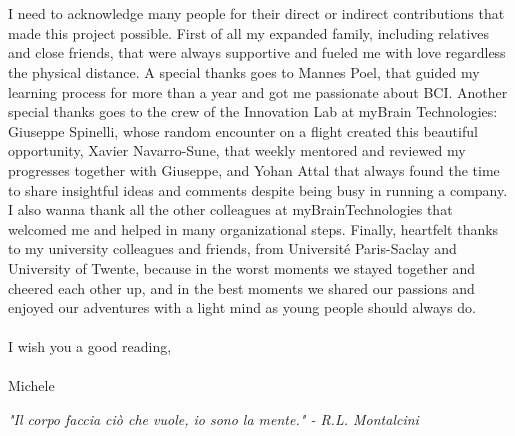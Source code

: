 \\
\\
I need to acknowledge many people for their direct or indirect contributions that made this project possible. First of all my expanded family, including relatives and close friends, that were always supportive and fueled me with love regardless the physical distance. A special thanks goes to Mannes Poel, that guided my learning process for more than a year and got me passionate about BCI. Another special thanks goes to the crew of the Innovation Lab at myBrain Technologies: Giuseppe Spinelli, whose random encounter on a flight created this beautiful opportunity, Xavier Navarro-Sune, that weekly mentored and reviewed my progresses together with Giuseppe, and Yohan Attal that always found the time to share insightful ideas and comments despite being busy in running a company. I also wanna thank all the other colleagues at myBrainTechnologies that welcomed me and helped in many organizational steps. Finally, heartfelt thanks to my university colleagues and friends, from Université Paris-Saclay and University of Twente, because in the worst moments we stayed together and cheered each other up, and in the best moments we shared our passions and enjoyed our adventures with a light mind as young people should always do. 
\\
\\
I wish you a good reading,
\\
\\
Michele

\vspace{5cm}
\centerline{\emph{"Il corpo faccia ciò che vuole, io sono la mente." - R.L. Montalcini}}






